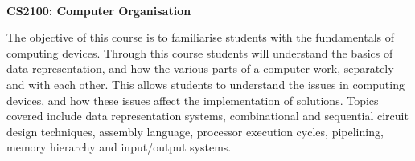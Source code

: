\documentclass[10pt]{article}
\begin{document}
\thispagestyle{empty}
\bigskip \
\vspace{0.1cm}

\begin{center}
{\fontsize{30}{30} \selectfont \bf \sffamily CS2100: Computer Organisation }\\
\vspace{24pt}
\end{center}

{\parindent0pt \baselineskip=15.5pt 
  The objective of this course is to familiarise students with the fundamentals
  of computing devices. Through this course students will understand the basics
  of data representation, and how the various parts of a computer work,
  separately and with each other. This allows students to understand the issues
  in computing devices, and how these issues affect the implementation of
  solutions. Topics covered include data representation systems, combinational
  and sequential circuit design techniques, assembly language, processor
  execution cycles, pipelining, memory hierarchy and input/output systems.
}

\microtoc%
\newpage








\end{document}
